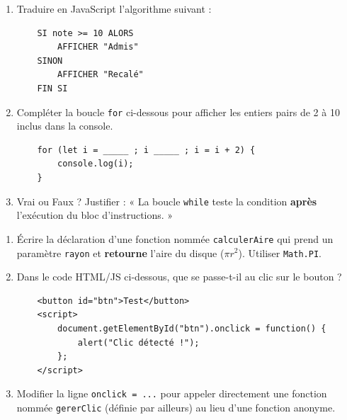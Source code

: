 \documentclass[11pt]{article}
\begin{document}
\begin{exercice}
\begin{enumerate}
    \item Traduire en JavaScript l'algorithme suivant :
    \begin{verbatim}
    SI note >= 10 ALORS
        AFFICHER "Admis"
    SINON
        AFFICHER "Recalé"
    FIN SI
    \end{verbatim}
    \item Compléter la boucle \texttt{for} ci-dessous pour afficher les entiers pairs de 2 à 10 inclus dans la console.
    \begin{verbatim}
    for (let i = _____ ; i _____ ; i = i + 2) {
        console.log(i);
    }
    \end{verbatim}
    \item Vrai ou Faux ? Justifier : « La boucle \texttt{while} teste la condition \textbf{après} l'exécution du bloc d'instructions. »
\end{enumerate}
\end{exercice}

\begin{exercice}
\begin{enumerate}
    \item Écrire la déclaration d'une fonction nommée \texttt{calculerAire} qui prend un paramètre \texttt{rayon} et \textbf{retourne} l'aire du disque ($\pi r^2$). Utiliser \texttt{Math.PI}.
    \item Dans le code HTML/JS ci-dessous, que se passe-t-il au clic sur le bouton ?
    \begin{verbatim}
    <button id="btn">Test</button>
    <script>
        document.getElementById("btn").onclick = function() {
            alert("Clic détecté !");
        };
    </script>
    \end{verbatim}
    \item Modifier la ligne \texttt{onclick = ...} pour appeler directement une fonction nommée \texttt{gererClic} (définie par ailleurs) au lieu d'une fonction anonyme.
\end{enumerate}
\end{exercice}
\end{document}
